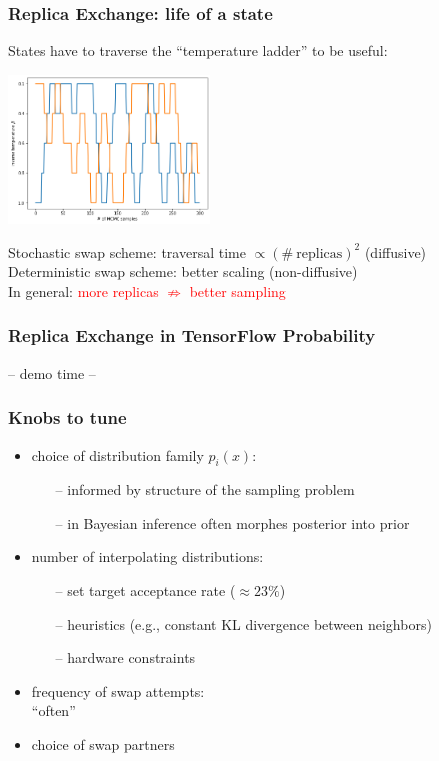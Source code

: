 \documentclass[t,aspectratio=169]{beamer}
\begin{document}
\begin{frame}
  \frametitle{Replica Exchange: life of a state}
  States have to traverse the ``temperature ladder'' to be useful:
  \begin{center}
    \includegraphics[width=0.4\textwidth]{images/state_trajectories}
  \end{center}
  Stochastic swap scheme: traversal time $\propto (\#\mathrm{\ replicas})^2$ (diffusive)\\
  Deterministic swap scheme: better scaling (non-diffusive)\\
  \bigskip
  In general: \textcolor{red}{more replicas $\nRightarrow$ better sampling}
\end{frame}

\begin{frame}
  \frametitle{Replica Exchange in TensorFlow Probability}
  \centering
  \vfill
  \Huge -- demo time --
  \vfill
\end{frame}

\begin{frame}
  \frametitle{Knobs to tune}
  \begin{itemize}
  \item choice of distribution family $p_i(x)$:
    \begin{itemize}
    \item[--] informed by structure of the sampling problem
    \item[--] in Bayesian inference often morphes posterior into prior 
    \end{itemize}
  \item number of interpolating distributions:\\
    \begin{itemize}
    \item[--] set target acceptance rate ($\approx 23\%$)
    \item[--] heuristics (e.g., constant KL divergence between neighbors)
    \item[--] hardware constraints
    \end{itemize}
  \item frequency of swap attempts:\\
    ``often''
  \item choice of swap partners
  \end{itemize}
\end{frame}
\end{document}
